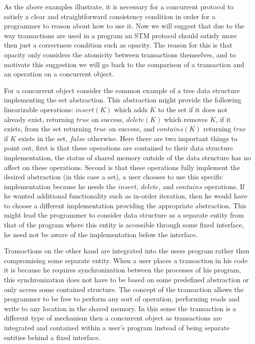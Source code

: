 As the above examples illustrate, it is necessary for a concurrent protocol
to satisfy a clear and straightforward consistency condition in order
for a programmer to reason about how to use it.
Now we will suggest that due to the way transactions are used in a program
an STM protocol should satisfy more then just a correctness condition
such as opacity.
The reason for this is that opacity only considers the atomicity between transactions themselves,
and to motivate this suggestion we will go back to the comparison of
a transaction and an operation on a concurrent object.

For a concurrent object consider the common example of a tree
data structure implementing the set abstraction.
This abstraction might provide the following linearizable operations:
$insert(K)$ which adds $K$ to the set if it does not already exist, returning $true$
on success, $delete(K)$ which removes $K$, if it exists, from the set
returning $true$ on success, and $contains(K)$ returning $true$ if $K$
exists in the set, $false$ otherwise.
Here there are two important things to point out, first is that these operations
are contained to their data structure implementation, the status of shared
memory outside of the data structure has no affect on these operations.
Second is that these operations fully implement the desired abstraction
(in this case a set),
a user chooses to use this specific implementation because he needs
the $insert$, $delete$, and $contains$ operations.
If he wanted additional functionality such as in-order iteration, then
he would have to choose a different implementation providing the appropriate
abstraction.
This might lead the programmer to consider data structure as a separate entity
from that of the program where this entity is accessible through some fixed
interface, he need not be aware of the implementation below the interface.

Transactions on the other hand are integrated into the users program
rather then compromising some separate entity.
When a user places a transaction in his code it is because he requires
synchronization between the processes of his program, this synchronization
does not have to be based on some predefined abstraction or only access
some contained structure.
The concept of the transaction allows the programmer to be free to
perform any sort of operation, performing reads and write to any
location in the shared memory.
In this sense the transaction is a different type of mechanism
then a concurrent object as transactions are integrated and contained within
a user's program instead of being separate entities behind
a fixed interface.

